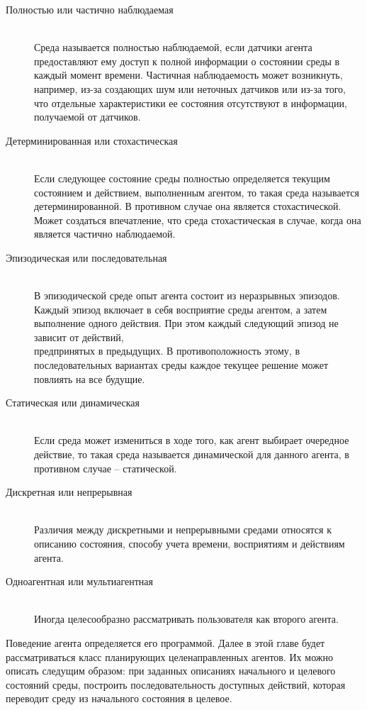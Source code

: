 \begin{description}
\item[Полностью или частично наблюдаемая] \hfill \\
  Среда называется полностью  наблюдаемой, если датчики агента предоставляют ему доступ к полной
  информации о состоянии среды в каждый момент времени. Частичная
  наблюдаемость может возникнуть, например, из-за создающих шум или
  неточных датчиков или из-за того, что отдельные характеристики ее
  состояния отсутствуют в информации, получаемой от датчиков.
\item[Детерминированная или стохастическая] \hfill \\Если следующее состояние среды
  полностью определяется текущим состоянием и действием, выполненным
  агентом, то такая среда называется детерминированной. В противном
  случае она является стохастической. Может создаться впечатление, что
  среда стохастическая в случае, когда она является частично
  наблюдаемой.
\item[Эпизодическая или последовательная] \hfill \\В эпизодической среде опыт агента
  состоит из неразрывных эпизодов. Каждый эпизод включает в себя
  восприятие среды агентом, а затем выполнение одного действия. При этом
  каждый следующий эпизод не зависит от действий,\\предпринятых в
  предыдущих. В противоположность этому, в последовательных вариантах
  среды каждое текущее решение может повлиять на все будущие.
\item[Статическая или динамическая] \hfill \\Если среда может измениться в ходе того,
  как агент выбирает очередное действие, то такая среда называется
  динамической для данного агента, в противном случае -- статической.
\item[Дискретная или непрерывная] \hfill \\Различия между дискретными и непрерывными
  средами относятся к описанию состояния, способу учета времени,
  восприятиям и действиям агента.
\item[Одноагентная или мультиагентная] \hfill \\Иногда целесообразно рассматривать
  пользователя как второго агента.
\end{description}
 
Поведение агента определяется его программой. Далее в этой главе будет рассматриваться класс планирующих целенаправленных агентов. Их можно описать следущим образом: при заданных описаниях начального и целевого состояний среды, построить последовательность доступных действий, которая переводит среду из начального состояния в целевое.

